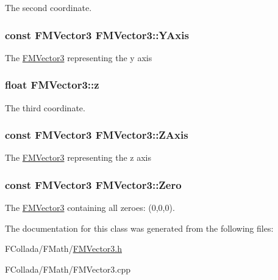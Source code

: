 \label{classFMVector3_a6e8a45596a095d86205557d7231ef973}
The second coordinate. \hypertarget{classFMVector3_a4e67235dec2d974161ecb965b6590555}{
\subsubsection[{YAxis}]{\setlength{\rightskip}{0pt plus 5cm}const {\bf FMVector3} {\bf FMVector3::YAxis}}}
\label{classFMVector3_a4e67235dec2d974161ecb965b6590555}
The \hyperlink{classFMVector3}{FMVector3} representing the y axis \hypertarget{classFMVector3_ad912906661058ab718fb887ad67f5ad4}{
\subsubsection[{z}]{\setlength{\rightskip}{0pt plus 5cm}float {\bf FMVector3::z}}}
\label{classFMVector3_ad912906661058ab718fb887ad67f5ad4}
The third coordinate. \hypertarget{classFMVector3_a3f1666b8e732a6480e3e3ac3416d0a22}{
\subsubsection[{ZAxis}]{\setlength{\rightskip}{0pt plus 5cm}const {\bf FMVector3} {\bf FMVector3::ZAxis}}}
\label{classFMVector3_a3f1666b8e732a6480e3e3ac3416d0a22}
The \hyperlink{classFMVector3}{FMVector3} representing the z axis \hypertarget{classFMVector3_a18fc0513121c660cc2dc3f172d698adb}{
\subsubsection[{Zero}]{\setlength{\rightskip}{0pt plus 5cm}const {\bf FMVector3} {\bf FMVector3::Zero}}}
\label{classFMVector3_a18fc0513121c660cc2dc3f172d698adb}
The \hyperlink{classFMVector3}{FMVector3} containing all zeroes: (0,0,0). 

The documentation for this class was generated from the following files:\begin{DoxyCompactItemize}
\item 
FCollada/FMath/\hyperlink{FMVector3_8h}{FMVector3.h}\item 
FCollada/FMath/FMVector3.cpp\end{DoxyCompactItemize}
